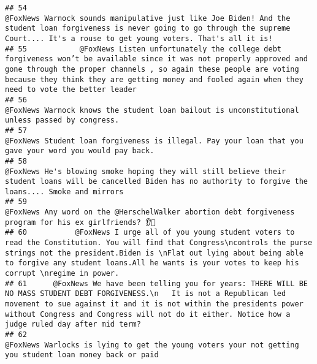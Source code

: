 \documentclass[
]{article}
\begin{document}
\begin{verbatim}
## 54                                                                                                       @FoxNews Warnock sounds manipulative just like Joe Biden! And the student loan forgiveness is never going to go through the supreme Court.... It's a rouse to get young voters. That's all it is!
## 55            @FoxNews Listen unfortunately the college debt forgiveness won’t be available since it was not properly approved and gone through the proper channels , so again these people are voting because they think they are getting money and fooled again when they need to vote the better leader
## 56                                                                                                                                                                                                          @FoxNews Warnock knows the student loan bailout is unconstitutional unless passed by congress.
## 57                                                                                                                                                                                                 @FoxNews Student loan forgiveness is illegal. Pay your loan that you gave your word you would pay back.
## 58                                                                                                                                      @FoxNews He's blowing smoke hoping they will still believe their student loans will be cancelled Biden has no authority to forgive the loans.... Smoke and mirrors
## 59                                                                                                                                                                                                 @FoxNews Any word on the @HerschelWalker abortion debt forgiveness program for his ex girlfriends? 👂🤡
## 60           @FoxNews I urge all of you young student voters to read the Constitution. You will find that Congress\ncontrols the purse strings not the president.Biden is \nFlat out lying about being able to forgive any student loans.All he wants is your votes to keep his corrupt \nregime in power.
## 61      @FoxNews We have been telling you for years: THERE WILL BE NO MASS STUDENT DEBT FORGIVENESS.\n   It is not a Republican led movement to sue against it and it is not within the presidents power without Congress and Congress will not do it either. Notice how a judge ruled day after mid term?
## 62                                                                                                                                                                                                 @FoxNews Warlocks is lying to get the young voters your not getting you student loan money back or paid

\end{verbatim}
\end{document}
